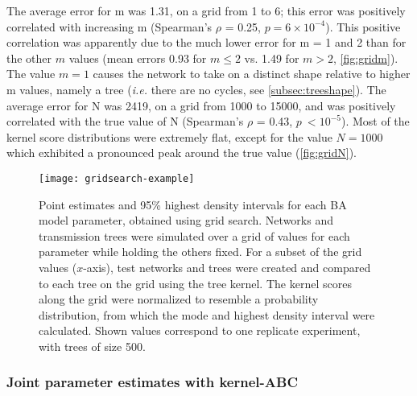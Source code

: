 The average error for \gls{m} was
    1.31,
on a grid from 1 to 6; this error was positively correlated with increasing
\gls{m}
    (Spearman's $\rho$ = 0.25,
     $p = 6\!\times\!10^{-4}$).
This positive correlation was apparently due to the much lower error for
\gls{m} = 1 and 2 than for the other $m$ values 
    (mean errors 
    0.93 
    for $m \leq 2$ vs. 
    1.49 
    for $m > 2$, \cref{fig:gridm}).
The value $m = 1$ causes the network to take on a distinct shape relative to
higher \gls{m} values, namely a tree (\textit{i.e.} there are no cycles,
see \cref{subsec:treeshape}). The average error for \gls{N} was 
    2419,
on a grid from 1000 to 15000, and was positively correlated with the true value
of \gls{N}
    (Spearman's $\rho$ = 0.43,
    $p\ {<}10^{-5}$). 
Most of the kernel score distributions were extremely flat, except for the
value $N = 1000$ which exhibited a pronounced peak around the true value
(\cref{fig:gridN}).

\begin{figure}[ht]
  \centering
  \texttt{[image: gridsearch-example]}
  \caption[Grid search estimates of \gls{BA} model parameters.]{Point estimates
      and 95\% highest density intervals for each \gls{BA} model parameter,
      obtained using grid search. Networks and transmission trees were
      simulated over a grid of values for each parameter while holding the
      others fixed. For a subset of the grid values ($x$-axis), test networks
      and trees were created and compared to each tree on the grid using the
      tree kernel. The kernel scores along the grid were normalized to resemble
      a probability distribution, from which the mode and highest density
      interval were calculated. Shown values correspond to one replicate
      experiment, with trees of size 500.
  } 
  \label{fig:gridest}
\end{figure}

\subsubsection*{Joint parameter estimates with kernel-ABC}



